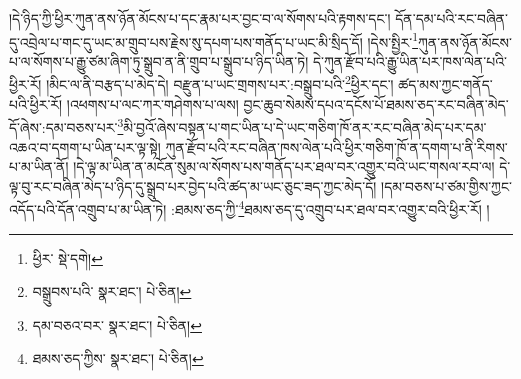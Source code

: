 །དེ་ཉིད་ཀྱི་ཕྱིར་ཀུན་ནས་ཉོན་མོངས་པ་དང་རྣམ་པར་བྱང་བ་ལ་སོགས་པའི་རྟགས་དང་། དོན་དམ་པའི་རང་བཞིན་དུ་འབྲེལ་པ་གང་དུ་ཡང་མ་གྲུབ་པས་རྗེས་སུ་དཔག་པས་གནོད་པ་ཡང་མི་སྲིད་དོ། །དེས་སྤྱིར་\footnote{ཕྱིར་  སྡེ་དགེ། }ཀུན་ནས་ཉོན་མོངས་པ་ལ་སོགས་པ་རྒྱུ་ཙམ་ཞིག་ཏུ་སྒྲུབ་ན་ནི་གྲུབ་པ་སྒྲུབ་པ་ཉིད་ཡིན་ཏེ། དེ་ཀུན་རྫོབ་པའི་རྒྱུ་ཡིན་པར་ཁས་ལེན་པའི་ཕྱིར་རོ། །མིང་ལ་ནི་བརྩད་པ་མེད་དེ། བརྫུན་པ་ཡང་གྲགས་པར་:བསྒྲུབ་པའི་\footnote{བསྒྲུབས་པའི་  སྣར་ཐང་།  པེ་ཅིན། }ཕྱིར་དང་། ཚད་མས་ཀྱང་གནོད་པའི་ཕྱིར་རོ། །འཕགས་པ་ལང་ཀར་གཤེགས་པ་ལས། བྱང་ཆུབ་སེམས་དཔའ་དངོས་པོ་ཐམས་ཅད་རང་བཞིན་མེད་དོ་ཞེས་:དམ་བཅས་པར་\footnote{དམ་བཅའ་བར་  སྣར་ཐང་།  པེ་ཅིན། }མི་བྱའོ་ཞེས་བསྟན་པ་གང་ཡིན་པ་དེ་ཡང་གཅིག་ཁོ་ནར་རང་བཞིན་མེད་པར་དམ་འཆའ་བ་དགག་པ་ཡིན་པར་ལྟ་སྟེ། ཀུན་རྫོབ་པའི་རང་བཞིན་ཁས་ལེན་པའི་ཕྱིར་གཅིག་ཁོ་ན་དགག་པ་ནི་རིགས་པ་མ་ཡིན་ནོ། །དེ་ལྟ་མ་ཡིན་ན་མངོན་སུམ་ལ་སོགས་པས་གནོད་པར་ཐལ་བར་འགྱུར་བའི་ཡང་གསལ་རབ་ལ། དེ་ལྟ་བུ་རང་བཞིན་མེད་པ་ཉིད་དུ་སྒྲུབ་པར་བྱེད་པའི་ཚད་མ་ཡང་ཅུང་ཟད་ཀྱང་མེད་དོ། །དམ་བཅས་པ་ཙམ་གྱིས་ཀྱང་འདོད་པའི་དོན་འགྲུབ་པ་མ་ཡིན་ཏེ། :ཐམས་ཅད་ཀྱི་\footnote{ཐམས་ཅད་ཀྱིས་  སྣར་ཐང་།  པེ་ཅིན། }ཐམས་ཅད་དུ་འགྲུབ་པར་ཐལ་བར་འགྱུར་བའི་ཕྱིར་རོ། །
